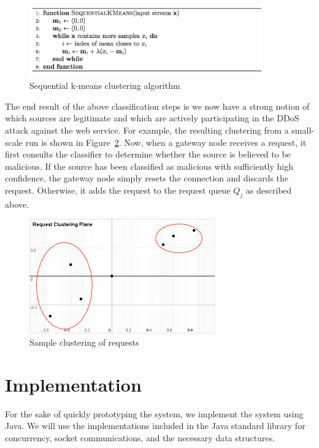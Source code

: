 \documentclass[twocolumn]{article}
\begin{document}
\begin{figure}
\begin{center}
\includegraphics[width=10cm]{algo.png}
\end{center}
\caption{Sequential k-means clustering algorithm}
\label{fig:kmeans}
\end{figure}

The end result of the above classification steps is we now have a strong notion of which sources are legitimate and which are actively participating in the DDoS attack against the web service. For example, the resulting clustering from a small-scale run is shown in Figure~\ref{fig:plane}. Now, when a gateway node receives a request, it first consults the classifier to determine whether the source is believed to be malicious. If the source has been classified as malicious with sufficiently high confidence, the gateway node simply resets the connection and discards the request. Otherwise, it adds the request to the request queue $Q_j$ as described above.

\begin{figure}
\begin{center}
\includegraphics[width=8cm]{plane.png}
\end{center}
\caption{Sample clustering of requests}
\label{fig:plane}
\end{figure}

\section{Implementation}

For the sake of quickly prototyping the system, we implement the system using Java. We will use the implementations included in the Java standard library for concurrency, socket communications, and the necessary data structures. 
\end{document}
